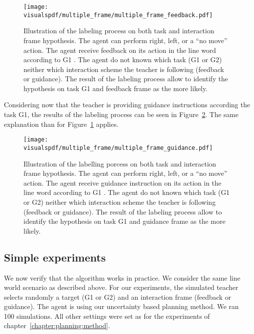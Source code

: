 \begin{figure}[!htbp]
\centering
\texttt{[image: \\visualspdf/multiple\_frame/multiple\_frame\_feedback.pdf]}
\caption{Illustration of the labeling process on both task and interaction frame hypothesis. The agent can perform right, left, or a ``no move'' action. The agent receive feedback on its action in the line word according to G1 . The agent do not known which task (G1 or G2) neither which interaction scheme the teacher is following (feedback or guidance). The result of the labeling process allow to identify the hypothesis on task G1 and feedback frame as the more likely.}
\label{fig:multipleframeexplainedfeedback}
\end{figure} 

Considering now that the teacher is providing guidance instructions according the task G1, the results of the labeling process can be seen in Figure~\ref{fig:multipleframeexplainedguidance}. The same explanation than for Figure~\ref{fig:multipleframeexplainedfeedback} applies. 

\begin{figure}[!htbp]
\centering
\texttt{[image: \\visualspdf/multiple\_frame/multiple\_frame\_guidance.pdf]}
\caption{Illustration of the labelling porcess on both task and interaction frame hypothesis. The agent can perform right, left, or a ``no move'' action. The agent receive guidance instruction on its action in the line word according to G1 . The agent do not known which task (G1 or G2) neither which interaction scheme the teacher is following (feedback or guidance). The result of the labeling process allow to identify the hypothesis on task G1 and guidance frame as the more likely.}
\label{fig:multipleframeexplainedguidance}
\end{figure} 

\subsection{Simple experiments}

We now verify that the algorithm works in practice. We consider the same line world scenario as described above. For our experiments, the simulated teacher selects randomly a target (G1 or G2) and an interaction frame (feedback or guidance). The agent is using our uncertainty based planning method. We ran 100 simulations. All other settings were set as for the experiments of chapter~\ref{chapter:planning:method}.

